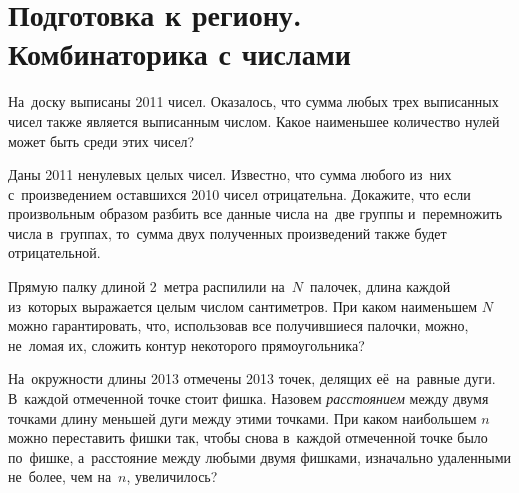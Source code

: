 
\section*{Подготовка к региону. Комбинаторика с числами}



\begin{problems}

\item
На~доску выписаны 2011 чисел.
Оказалось, что сумма любых трех выписанных чисел также является выписанным
числом.
Какое наименьшее количество нулей может быть среди этих чисел?

\item
Даны 2011 ненулевых целых чисел.
Известно, что сумма любого из~них с~произведением оставшихся 2010 чисел
отрицательна.
Докажите, что если произвольным образом разбить все данные числа на~две группы
и~перемножить числа в~группах, то~сумма двух полученных произведений также
будет отрицательной.

\item
Прямую палку длиной 2~метра распилили на~$N$~палочек, длина каждой из~которых
выражается целым числом сантиметров.
При каком наименьшем $N$ можно гарантировать, что, использовав все получившиеся
палочки, можно, не~ломая их, сложить контур некоторого прямоугольника?

\item
На~окружности длины 2013 отмечены 2013 точек, делящих её~на~равные дуги.
В~каждой отмеченной точке стоит фишка.
Назовем \emph{расстоянием} между двумя точками длину меньшей дуги между этими
точками.
При каком наибольшем $n$ можно переставить фишки так, чтобы снова в~каждой
отмеченной точке было по~фишке, а~расстояние между любыми двумя фишками,
изначально удаленными не~более, чем на~$n$, увеличилось?

\end{problems}

